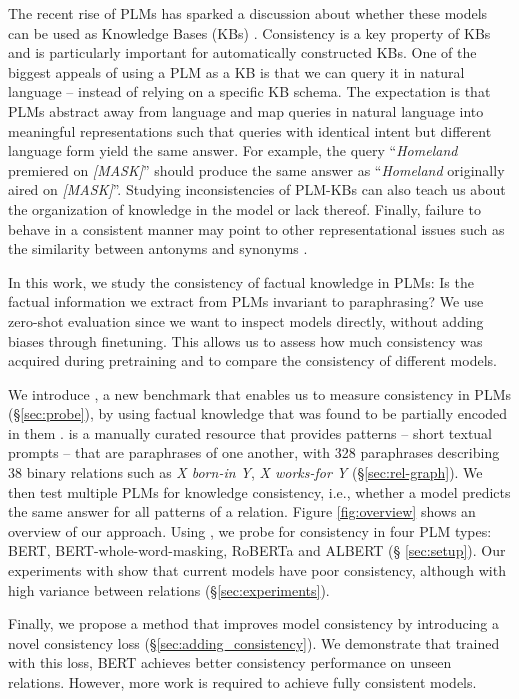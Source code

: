 The recent rise of PLMs has sparked a discussion about whether these models can be used as Knowledge Bases (KBs) \cite{lama,petroni2020how,alpaqa,roberts2020much}. 
Consistency is a key property of KBs and is particularly important for automatically constructed KBs. %
One of the biggest appeals of using a PLM as a KB is that we can
query it in natural language -- instead of relying on a specific KB schema.
The expectation is that PLMs abstract away from language and map queries in natural language into meaningful representations such that queries with identical intent but different language form yield the same answer. 
For example, the query ``\textit{Homeland} premiered on \textit{[MASK]}'' should produce the same answer as ``\textit{Homeland} originally aired on \textit{[MASK]}''.
Studying inconsistencies of PLM-KBs can also teach us about the organization of knowledge in the model or lack thereof. 
Finally, failure to behave in a consistent manner may point
to other representational issues
such as the similarity between antonyms and synonyms
\cite{nguyen2016integrating}.


In this work, we study the consistency of factual knowledge
in PLMs: Is the factual information we extract from PLMs
invariant to paraphrasing? We use zero-shot evaluation since
we want to inspect models directly, without adding biases
through finetuning. This allows us to assess how
much consistency was acquired during pretraining and to
compare the consistency of different models.



We introduce \resource{}, a new benchmark that enables us to measure consistency in PLMs (\S \ref{sec:probe}), by using factual knowledge that was found to be partially encoded in them \cite{lama,alpaqa}.
\resource{} is a manually curated resource
that provides patterns -- short textual prompts -- that are paraphrases of one another, with 328 paraphrases describing 38 binary relations such as \textit{X born-in Y}, \textit{X works-for Y} (\S \ref{sec:rel-graph}).
We then test multiple PLMs for knowledge consistency, i.e., whether
a model  predicts the same answer for all patterns of a relation.
Figure \ref{fig:overview} shows an overview of our approach.
Using \resource{}, we probe for consistency in four PLM
types: BERT, BERT-whole-word-masking, RoBERTa and ALBERT (\S
\ref{sec:setup}).
Our experiments with \resource{} show that
current models have poor consistency, although with high variance between relations (\S \ref{sec:experiments}). 

Finally, we propose a method that improves model consistency
by introducing a novel consistency loss
(\S \ref{sec:adding_consistency}). We demonstrate that
trained with this loss, BERT achieves better consistency performance on unseen relations. However, more work is required to achieve fully consistent models.
